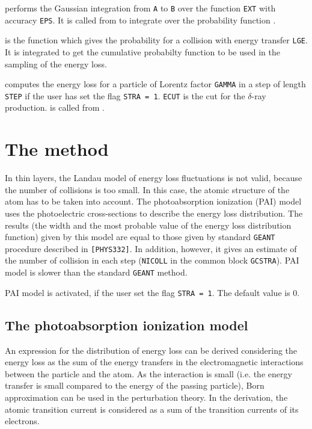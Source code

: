  performs the Gaussian integration from {\tt A} to
{\tt B} over the function {\tt EXT} with accuracy {\tt EPS}.
It is called from  to integrate over the probability
function .

 is the function which gives the probability for a collision
with energy transfer {\tt LGE}. It is integrated to get the
cumulative probabilty function to be used in the sampling
of the energy loss.

 computes the energy loss for a particle of
Lorentz factor {\tt GAMMA} in a step of length {\tt STEP}
if the user has set the flag {\tt STRA = 1}.
{\tt ECUT} is the cut for the $\delta$-ray production.
 is called from .

\section{The method}
In thin layers, the Landau model of energy loss fluctuations
is not valid, because the number of collisions is too small.
In this case, the atomic structure of the atom has to be
taken into account. The photoabsorption ionization
(PAI) model uses the photoelectric cross-sections
to describe the energy loss distribution.
The results (the width and the most probable value of
the energy loss distribution function)
given by this model are equal to those given by
standard {\tt GEANT} procedure described in {\tt [PHYS332]}.
In addition, however, it gives an estimate of the number
of collision in each step ({\tt NICOLL} in the common block
{\tt GCSTRA}). PAI model is slower than the standard
{\tt GEANT} method.

PAI model is activated, if the user set the flag
{\tt STRA = 1}. The default value is 0.

\subsection{The photoabsorption ionization model}
An expression for the distribution of energy loss can be derived
considering the energy loss as the sum of the energy transfers in
the electromagnetic interactions between
the particle and the atom.
As the interaction is small (i.e. the energy transfer is
small compared to the energy of the passing particle),
Born approximation can be used in the perturbation theory.
In the derivation, the atomic transition current is
considered as a sum of the transition currents of its
electrons.


